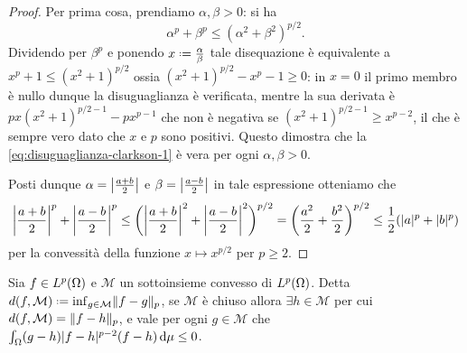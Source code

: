 \begin{proof}
    Per prima cosa, prendiamo $\alpha,\beta>0$: si ha
    \begin{equation}
        \alpha^p+\beta^p\le(\alpha^2+\beta^2)^{p/2}.
        \label{eq:disuguaglianza-clarkson-1}
    \end{equation}
    Dividendo per $\beta^p$ e ponendo $x\defeq\frac{\alpha}{\beta}$ tale disequazione è equivalente a $x^p+1\le(x^2+1)^{p/2}$ ossia $(x^2+1)^{p/2}-x^p-1\ge 0$: in $x=0$ il primo membro è nullo dunque la disuguaglianza è verificata, mentre la sua derivata è $px(x^2+1)^{p/2-1}-px^{p-1}$ che non è negativa se $(x^2+1)^{p/2-1}\ge x^{p-2}$, il che è sempre vero dato che $x$ e $p$ sono positivi.
    Questo dimostra che la \eqref{eq:disuguaglianza-clarkson-1} è vera per ogni $\alpha,\beta>0$.

    Posti dunque $\alpha=\abs[\big]{\frac{a+b}2}$ e $\beta=\abs[\big]{\frac{a-b}2}$ in tale espressione otteniamo che
    \begin{equation}
        \abs[\bigg]{\frac{a+b}2}^p+\abs[\bigg]{\frac{a-b}2}^p\le
        \biggl(\abs[\bigg]{\frac{a+b}2}^2+\abs[\bigg]{\frac{a-b}2}^2\biggr)^{p/2}=
        \biggl(\frac{a^2}2+\frac{b^2}2\biggr)^{p/2}\le
        \frac12(\abs{a}^p+\abs{b}^p)
    \end{equation}
    per la convessità della funzione $x\mapsto x^{p/2}$ per $p\ge 2$.
\end{proof}
\begin{lemma}
    Sia $f\in\leb[p]{\Omega}$ e $\mathcal{M}$ un sottoinsieme convesso di $\leb[p]{\Omega}$.
    Detta $d(f,\mathcal{M})\defeq\inf_{g\in\mathcal{M}}\norm{f-g}_p$, se $\mathcal{M}$ è chiuso allora $\exists h\in\mathcal{M}$ per cui $d(f,\mathcal{M})=\norm{f-h}_p$, e vale per ogni $g\in\mathcal{M}$ che $\int_\Omega (g-h)\abs{f-h}^{p-2}(f-h)\,\dd\mu\le 0$.
\end{lemma}
